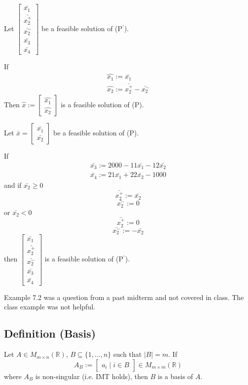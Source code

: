 Let
$\begin{bmatrix}
    \bar{x_1}\\
    \bar{x_2^+}\\
    \bar{x_2^-}\\
    \bar{x_3}\\
    \bar{x_4}
\end{bmatrix}$
be a feasible solution of (P$^\prime$).


If
\begin{align*}
    \hat{x_1}:=\bar{x_1}\\
    \hat{x_2}:=\bar{x_2^+}-\bar{x_2^-}
\end{align*}
Then 
$\hat{x}:=
\begin{bmatrix}
    \hat{x_1}\\
    \hat{x_2}
\end{bmatrix}$
is a feasible solution of (P).


Let
$\bar{x}=
\begin{bmatrix}
    \bar{x_1}\\
    \bar{x_2}
\end{bmatrix}$
be a feasible solution of (P).


If
\begin{align*}
    \bar{x_3}:=2000-11\bar{x_1}-12\bar{x_2}\\
    \bar{x_4}:=21\bar{x_1}+22\bar{x_2}-1000
\end{align*}
and 
if $\bar{x_2}\ge 0$
\[\bar{x_2^+}:=\bar{x_2}\]
\[\bar{x_2^-}:=0\]
or $\bar{x_2}< 0$
\[\bar{x_2^+}:=0\]
\[\bar{x_2^-}:=-\bar{x_2}\]
then
$\begin{bmatrix}
    \bar{x_1}\\
    \bar{x_2^+}\\
    \bar{x_2^-}\\
    \bar{x_3}\\
    \bar{x_4}
\end{bmatrix}$
is a feasible solution of (P$^\prime$).
\begin{remark}
    Example 7.2 was a question from a past midterm and not covered in class. The class example was
    not helpful.
\end{remark}

\subsection{Definition (Basis)}
Let $A\in M_{m\times n}(\mathbb{R})$, $B\subseteq\{1,\dots,n\}$ such that $|B|=m$. If
\[A_B:=
\begin{bmatrix}
    a_i \mid i\in B
\end{bmatrix}\in M_{m\times m}(\mathbb{R})
\]
where $A_B$ is non-singular (i.e. IMT holds), then $B$ is a basis of $A$.


